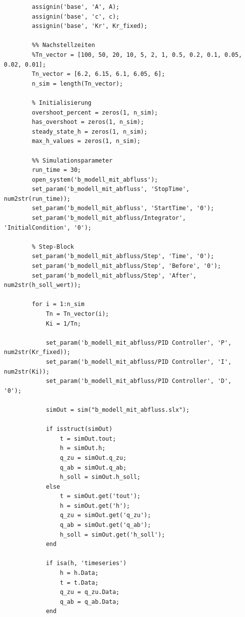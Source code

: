 \begin{sourcecode}
    \caption{\textit{Matlab}-Code zur Simulation und Berechnung der Überschwinger}
    \begin{verbatim}
        assignin('base', 'A', A);
        assignin('base', 'c', c);
        assignin('base', 'Kr', Kr_fixed);

        %% Nachstellzeiten  
        %Tn_vector = [100, 50, 20, 10, 5, 2, 1, 0.5, 0.2, 0.1, 0.05, 0.02, 0.01];
        Tn_vector = [6.2, 6.15, 6.1, 6.05, 6];
        n_sim = length(Tn_vector);

        % Initialisierung 
        overshoot_percent = zeros(1, n_sim);
        has_overshoot = zeros(1, n_sim);
        steady_state_h = zeros(1, n_sim);
        max_h_values = zeros(1, n_sim);

        %% Simulationsparameter 
        run_time = 30;
        open_system('b_modell_mit_abfluss');
        set_param('b_modell_mit_abfluss', 'StopTime', num2str(run_time));
        set_param('b_modell_mit_abfluss', 'StartTime', '0');
        set_param('b_modell_mit_abfluss/Integrator', 'InitialCondition', '0');

        % Step-Block
        set_param('b_modell_mit_abfluss/Step', 'Time', '0');
        set_param('b_modell_mit_abfluss/Step', 'Before', '0');
        set_param('b_modell_mit_abfluss/Step', 'After', num2str(h_soll_wert));

        for i = 1:n_sim
            Tn = Tn_vector(i);
            Ki = 1/Tn; 
                       
            set_param('b_modell_mit_abfluss/PID Controller', 'P', num2str(Kr_fixed));
            set_param('b_modell_mit_abfluss/PID Controller', 'I', num2str(Ki));
            set_param('b_modell_mit_abfluss/PID Controller', 'D', '0');
            
            simOut = sim("b_modell_mit_abfluss.slx");
            
            if isstruct(simOut)
                t = simOut.tout;
                h = simOut.h;
                q_zu = simOut.q_zu;
                q_ab = simOut.q_ab;
                h_soll = simOut.h_soll;
            else
                t = simOut.get('tout');
                h = simOut.get('h');
                q_zu = simOut.get('q_zu');
                q_ab = simOut.get('q_ab');
                h_soll = simOut.get('h_soll');
            end
            
            if isa(h, 'timeseries')
                h = h.Data;
                t = t.Data;
                q_zu = q_zu.Data;
                q_ab = q_ab.Data;
            end
                                         
    \end{verbatim}
\label{code_2b1}
\end{sourcecode}

